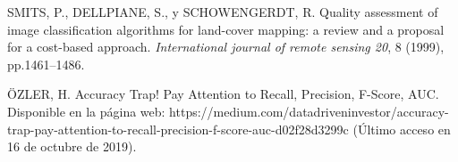 \begin{thebibliography}{9}
 SMITS, P., DELLPIANE, S., y SCHOWENGERDT, R. Quality assessment of image classification algorithms for land-cover mapping: a review and a proposal for a cost-based approach. \textit{International journal of remote sensing 20}, 8 (1999), pp.1461–1486.


 \"{O}ZLER, H. Accuracy Trap! Pay Attention to Recall, Precision, F-Score, AUC. Disponible en la p\'{a}gina web: https://medium.com/datadriveninvestor/accuracy-trap-pay-attention-to-recall-precision-f-score-auc-d02f28d3299c (\'{U}ltimo acceso en 16 de octubre de 2019).

\end{thebibliography} 
